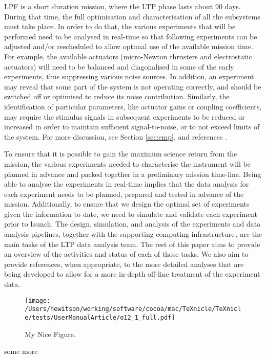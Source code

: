 LPF is a short duration mission, where the LTP phase lasts about 90 days. During that
time, the full optimisation and characterisation of all the subsystems must
take place. In order to do that, the various experiments that will be performed
need to be analysed in real-time so that following experiments can be adjusted and/or
rescheduled to allow optimal use of the available mission time. For example,
the available actuators (micro-Newton thrusters and electrostatic actuators) will
need to be balanced and diagonalised in some of the early experiments, thus
suppressing various noise sources. In addition, an experiment may reveal that some
part of the system is not operating correctly, and should be switched off or
optimised to reduce its noise contribution. Similarly, the identification of particular
parameters, like actuator gains or coupling coefficients, may require the
stimulus signals in subsequent experiments to be reduced or increased in order
to maintain sufficient signal-to-noise, or to not exceed limits of the system.
For more discussion, see Section \ref{sec:emp}, and references \cite{Bortoluzzi04,stefano}.




To ensure that it is possible to gain the maximum science return from the mission,
the various experiments needed to characterise the instrument will be planned
in advance and packed together in a preliminary mission time-line. Being able
to analyse the experiments in real-time implies that the data analysis for each
experiment needs to be planned, prepared and tested in advance of the mission.
Additionally, to ensure that we design the optimal set of experiments given the
information to date, we need to simulate and validate each experiment prior to
launch. The design, simulation, and analysis of the experiments and data analysis
pipelines, together with the supporting computing infrastructure\,\cite{Hewitson09},
are the main tasks of the LTP data analysis team. The rest of this paper
aims to provide an overview of the activities and status of each of those tasks.
We also aim to provide references, when appropriate, to the more detailed analyses
that are being developed to allow for a more in-depth off-line treatment of
the experiment data.

\begin{figure}[htbp]
\centering
\texttt{[image: /Users/hewitson/working/software/cocoa/mac/TeXnicle/TeXnicle/tests/UserManualArticle/o12\_1\_full.pdf]}
\caption{My Nice Figure.}
\label{fig:myfigure}
\end{figure}

some more 




